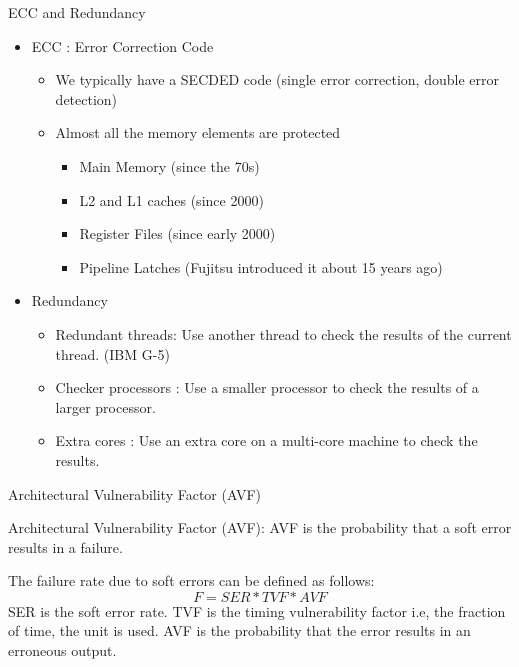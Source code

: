 \documentclass{beamer}
\begin{document}
\begin{frame}{ECC and Redundancy}
 \begin{itemize}
  \item ECC : Error Correction Code
    \begin{itemize}
    \item We typically have a SECDED code (single error correction, double error detection)
    \item Almost all the memory elements are protected
      \begin{itemize}
	\item {\color{blue!500} Main Memory} (since the 70s)
	\item {\color{blue}L2 and L1 caches} (since 2000)
	\item {\color{blue}Register Files} (since early 2000)
	\item {\color{blue}Pipeline Latches} (Fujitsu introduced it about 15 years ago)
      \end{itemize}
    \end{itemize}
\pause
  \item Redundancy 
      \begin{itemize}
	\item Redundant threads: Use another thread to check the results of the current thread. (IBM G-5)
	\item Checker processors : Use a smaller processor to check the results of a larger processor.
	\item Extra cores : Use an extra core on a multi-core machine to check the results. 
      \end{itemize}

 \end{itemize}
\end{frame}

\begin{frame}{Architectural Vulnerability Factor (AVF)}
 \begin{definition}{Architectural Vulnerability Factor (AVF):}
    AVF is the probability that a soft error results in a failure. 
 \end{definition}
The failure rate due to soft errors can be defined as follows: 
\begin{equation*}
 F = SER * TVF * AVF
\end{equation*}
SER is the soft error rate. 
TVF is the timing vulnerability factor i.e, the fraction of time, the unit is used. 
AVF is the probability that the error results in an erroneous output. 
\end{frame}
\end{document}
